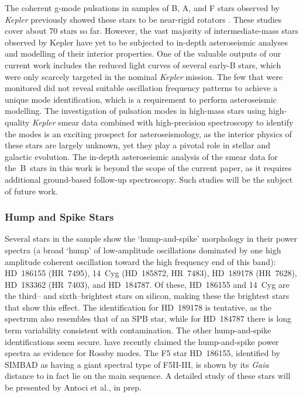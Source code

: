 \documentclass[a4paper,fleqn,usenatbib]{mnras}
\newcommand{\kepler}{\emph{Kepler}\xspace}
\newcommand{\gaia}{\emph{Gaia}\xspace}
\begin{document}
The coherent g-mode pulsations in samples of B, A, and F stars observed by \kepler previously showed these stars to be near-rigid rotators \citep{kurtz2014,saio15,triana15,vanreeth15,vanreeth16,vanreeth18,murphy16,schmid16,moravveji16,ouazzani17,papics17,aerts17,szewczuk18}. These studies cover about 70 stars so far. However, the vast majority of intermediate-mass stars observed by Kepler have yet to be subjected to in-depth asteroseismic analyses and modelling of their interior properties. One of the valuable outputs of our current work includes the reduced light curves of several early-B stars, which were only scarcely targeted in the nominal \kepler mission. The few that were monitored did not reveal suitable oscillation frequency patterns to achieve a unique mode identification, which is a requirement to perform asteroseismic modelling. The investigation of pulsation modes in high-mass stars using high-quality \kepler smear data combined with high-precision spectroscopy to identify the modes \citep[Chapter 6]{aertsbook} is an exciting prospect for asteroseismology, as the interior physics of these stars are largely unknown, yet they play a pivotal role in stellar and galactic evolution. The in-depth asteroseismic analysis of the smear data for the~B~stars in this work is beyond the scope of the current paper, as it requires additional ground-based follow-up spectroscopy. Such studies will be the subject of future work.

\subsubsection{Hump and Spike Stars}
\label{hs}

Several stars in the sample show the `hump-and-spike' morphology in their power spectra (a broad `hump' of low-amplitude oscillations dominated by one high amplitude coherent oscillation toward the high frequency end of this band): HD~186155 (HR~7495), 14~Cyg (HD~185872, HR~7483), HD~189178 (HR~7628), HD~183362 (HR~7403), and HD~184787. Of these, HD~186155 and 14~Cyg are the third-- and sixth--brightest stars on silicon, making these the brightest stars that show this effect. The identification for HD~189178 is tentative, as the spectrum also resembles that of an SPB star, while for HD~184787 there is long term variability consistent with contamination. The other hump-and-spike identifications seem secure. \citet{2018MNRAS.474.2774S} have recently claimed the hump-and-spike power spectra as evidence for Rossby modes. The F5 star HD~186155, identified by SIMBAD as having a giant spectral type of F5II-III, is shown by its \gaia distance to in fact lie on the main sequence. A detailed study of these stars will be presented by Antoci et al., in prep.
\end{document}

